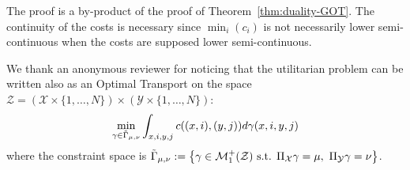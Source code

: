 \begin{prv*}
The proof is a by-product of the proof of Theorem~\ref{thm:duality-GOT}. The continuity of the costs is necessary since $\min_i(c_i)$ is not necessarily lower semi-continuous when the costs are supposed lower semi-continuous.
\end{prv*}

\begin{rmq} 
We thank an anonymous reviewer for noticing that the utilitarian problem can be written also as an Optimal Transport on the space  $\mathcal{Z} = (\mathcal{X}\times\{1,\dots,N\})\times(\mathcal{Y}\times\{1,\dots,N\})$:
\begin{align*}
    \min_{\gamma\in\Tilde{\Gamma}_{\mu,\nu}}\int_{x,i,y,j} c((x,i),(y,j))d\gamma(x,i,y,j) 
\end{align*}
where the constraint space is  $\Tilde{\Gamma}_{\mu,\nu}:=\left\{\gamma\in\mathcal{M}_1^+(\mathcal{Z})\text{ s.t. }\Pi_{\mathcal{X}}\gamma = \mu,~\Pi_{\mathcal{Y}}\gamma = \nu\right\}$.
\end{rmq}




